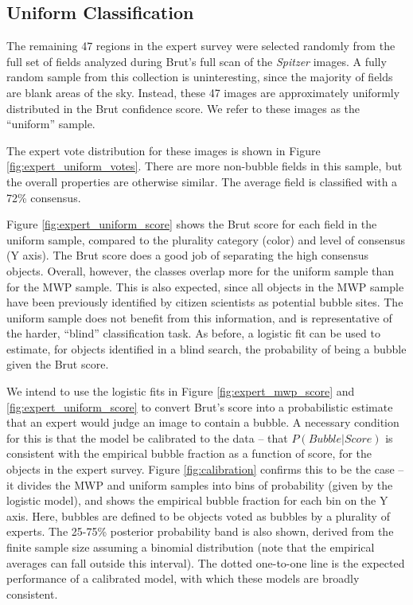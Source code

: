 \documentclass[preprint]{aastex}
\begin{document}
\subsection{Uniform Classification}
The remaining 47 regions in the expert survey were selected randomly from the full set of fields analyzed during Brut's full scan of the \emph{Spitzer} images. A fully random sample from this collection is uninteresting, since the majority of fields are blank areas of the sky. Instead, these 47 images are approximately uniformly distributed in the Brut confidence score. We refer to these images as the ``uniform'' sample. 

The expert vote distribution for these images is shown in Figure \ref{fig:expert_uniform_votes}. There are more non-bubble fields in this sample, but the overall properties are otherwise similar. The average field is classified with a 72\% consensus.

Figure \ref{fig:expert_uniform_score} shows the Brut score for each field in the uniform sample, compared to the plurality category (color) and level of consensus (Y axis). The Brut score does a good job of separating the high consensus objects. Overall, however, the classes overlap more for the uniform sample than for the MWP sample. This is also expected, since all objects in the MWP sample have been previously identified by citizen scientists as potential bubble sites. The uniform sample does not benefit from this information, and is representative of the harder, ``blind'' classification task. As before, a logistic fit can be used to estimate, for objects identified in a blind search, the probability of being a bubble given the Brut score.

We intend to use the logistic fits in Figure \ref{fig:expert_mwp_score} and \ref{fig:expert_uniform_score} to convert Brut's score into a probabilistic estimate that an expert would judge an image to contain a bubble. A necessary condition for this is that the model be calibrated to the data -- that $P(Bubble | Score)$  is consistent with the empirical bubble fraction as a function of score, for the objects in the expert survey. Figure \ref{fig:calibration} confirms this to be the case -- it divides the MWP and uniform samples into bins of probability (given by the logistic model), and shows the empirical bubble fraction for each bin on the Y axis. Here, bubbles are defined to be objects voted as bubbles by a plurality of experts. The 25-75\% posterior probability band is also shown, derived from the finite sample size assuming a binomial distribution (note that the empirical averages can fall outside this interval). The dotted one-to-one line is the expected performance of a calibrated model, with which these models are broadly consistent.
\end{document}
